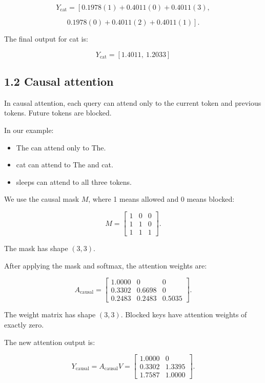 \documentclass[11pt]{article}
\begin{document}
\[
Y_{\mathrm{cat}}
=
\left[
0.1978(1)+0.4011(0)+0.4011(3),
\right.
\]

\[
\left.
0.1978(0)+0.4011(2)+0.4011(1)
\right].
\]

The final output for cat is:

\[
\boxed{
Y_{\mathrm{cat}}=[1.4011,\ 1.2033]
}
\]

\subsection*{1.2 Causal attention}
In causal attention, each query can attend only to
the current token and previous tokens. Future tokens
are blocked.

In our example:
\begin{itemize}
    \item The can attend only to The.
    \item cat can attend to The and cat.
    \item sleeps can attend to all three tokens.
\end{itemize}

We use the causal mask $M$, where 1 means allowed
and 0 means blocked:

\[
M=
\begin{bmatrix}
1 & 0 & 0\\
1 & 1 & 0\\
1 & 1 & 1
\end{bmatrix}.
\]

The mask has shape $(3,3)$.

After applying the mask and softmax, the attention
weights are:

\[
A_{\mathrm{causal}}=
\begin{bmatrix}
1.0000 & 0 & 0\\
0.3302 & 0.6698 & 0\\
0.2483 & 0.2483 & 0.5035
\end{bmatrix}.
\]

The weight matrix has shape $(3,3)$. Blocked keys
have attention weights of exactly zero.

The new attention output is:

\[
Y_{\mathrm{causal}}=A_{\mathrm{causal}}V
=
\begin{bmatrix}
1.0000 & 0\\
0.3302 & 1.3395\\
1.7587 & 1.0000
\end{bmatrix}.
\]
\end{document}
